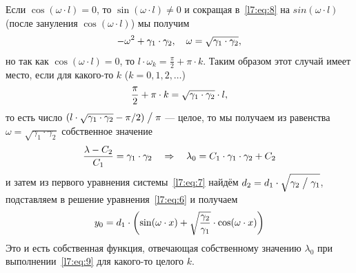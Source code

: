 Если $\cos(\omega\cdot l)=0$, то $\sin(\omega\cdot l)\neq0$ и сокращая в~\eqref{l7:eq:8} на $sin(\omega\cdot l)$ (после зануления $\cos(\omega\cdot l)$) мы получим 
\begin{equation*}
	\hfill-\omega^2+\gamma_1\cdot\gamma_2,\quad\omega=\sqrt{\gamma_1\cdot\gamma_2},\hfill
\end{equation*}
но так как $\cos(\omega\cdot l)=0$, то $l\cdot\omega_k=\displaystyle\frac{\pi}{2}+\pi\cdot k$. Таким образом этот случай имеет место, если для какого-то $k$ ($k=0,1,2,\ldots$)
\begin{equation}
	\label{l7:eq:9}
	\hfill\frac{\pi}{2}+\pi\cdot k=\sqrt{\gamma_1\cdot\gamma_2}\cdot l,\hfill
\end{equation} 
то есть число $(l\cdot\sqrt{\gamma_1\cdot\gamma_2}-\pi/2)\bigm/\pi$ --- целое, то мы получаем из равенства $\omega=\sqrt{\gamma_1\cdot\gamma_2}$ собственное значение 
\begin{equation*}
	\hfill\frac{\lambda-C_2}{C_1}=\gamma_1\cdot\gamma_2\quad\Rightarrow\quad\lambda_0=C_1\cdot\gamma_1\cdot\gamma_2+C_2\hfill
\end{equation*}
и затем из первого уравнения системы~\eqref{l7:eq:7} найдём $d_2=d_1\cdot\sqrt{\gamma_2\bigm/\gamma_1}$, подставляем в решение уравнения~\eqref{l7:eq:6} и получаем 
\begin{equation*}
	\hfill y_0=d_1\cdot\left(\sin(\omega\cdot x)+\sqrt{\frac{\gamma_2}{\gamma_1}}\cdot\cos(\omega\cdot x)\right)\hfill
\end{equation*}
Это и есть собственная функция, отвечающая собственному значению $\lambda_0$ при выполнении~\eqref{l7:eq:9} для какого-то целого $k$. 

